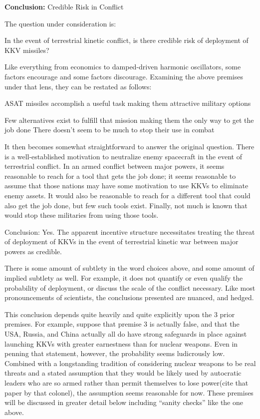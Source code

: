 \begin{center}
  {\bf Conclusion:} Credible Risk in Conflict
\end{center}

The question under consideration is:

\begin{blockquote}
  In the event of terrestrial kinetic conflict, is there credible risk
  of deployment of KKV missiles?
\end{blockquote}

Like everything from economics to damped-driven harmonic oscillators,
some factors encourage and some factors discourage.  Examining the
above premises under that lens, they can be restated as follows:

ASAT missiles accomplish a useful task making them attractive military options

Few alternatives exist to fulfill that mission making them the only way to get the job done
There doesn't seem to be much to stop their use in combat

It then becomes somewhat straightforward to answer the original
question.  There is a well-established motivation to neutralize enemy
spacecraft in the event of terrestrial conflict.  In an armed conflict
between major powers, it seems reasonable to reach for a tool that
gets the job done; it seems reasonable to assume that those nations
may have some motivation to use KKVs to eliminate enemy assets.  It
would also be reasonable to reach for a different tool that could also
get the job done, but few such tools exist.  Finally, not much is
known that would stop these militaries from using those tools.

Conclusion: Yes.  The apparent incentive structure necessitates
treating the threat of deployment of KKVs in the event of terrestrial
kinetic war between major powers as credible.

There is some amount of subtlety in the word choices above, and some
amount of implied subtlety as well.  For example, it does not quantify
or even qualify the probability of deployment, or discuss the scale of
the conflict necessary.  Like most pronouncements of scientists, the
conclusions presented are nuanced, and hedged.

This conclusion depends quite heavily and quite explicitly upon the 3
prior premises.  For example, suppose that premise 3 is actually
false, and that the USA, Russia, and China actually all do have strong
safeguards in place against launching KKVs with greater earnestness
than for nuclear weapons.  Even in penning that statement, however,
the probability seems ludicrously low.  Combined with a longstanding
tradition of considering nuclear weapons to be real threats and a
stated assumption that they would be likely used by autocratic leaders
who are so armed rather than permit themselves to lose power(cite that
paper by that colonel), the assumption seems reasonable for now.
These premises will be discussed in greater detail below including
``sanity checks'' like the one above.

